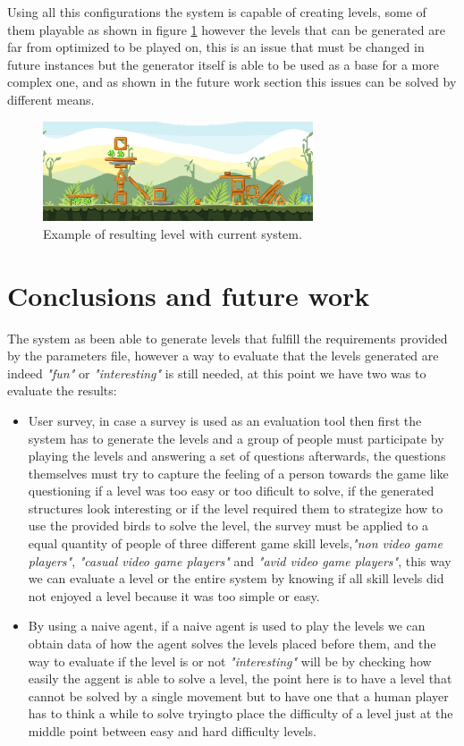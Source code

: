 \documentclass[conference]{IEEEtran}
\begin{document}
Using all this configurations the system is capable of creating levels, some of
them playable as shown in figure \ref{result_1} however the levels that can be
generated are far from optimized to be played on, this is an issue that must be
changed in future instances but the generator itself is able to be used as a
base for a more complex one, and as shown in the future work section this issues
can be solved by different means.

\begin{figure}[htbp]
    \centerline{\includegraphics[width=80mm]{Images/Result_n2.png}}
    \caption{Example of resulting level with current system.}
    \label{result_1}
\end{figure}

\section{Conclusions and future work}

The system as been able to generate levels that fulfill the requirements
 provided by the parameters file, however a way to evaluate that the levels
 generated are indeed \textit{"fun"} or \textit{"interesting"} is still needed,
 at this point we have two was to evaluate the results:
 \begin{itemize}
    \item User survey, in case a survey is used as an evaluation tool then first
    the system has to generate the levels and a group of people must participate
    by playing the levels and answering a set of questions afterwards, the
    questions themselves must try to capture the feeling of a person towards the
    game like questioning if a level was too easy or too dificult to solve, if
    the generated structures look interesting or if the level required them to
    strategize how to use the provided birds to solve the level, the survey must
    be applied to a equal quantity of people of three different game skill
    levels,\textit{"non video game players"}, \textit{"casual video game
    players"} and \textit{"avid video game players"}, this way we can evaluate a
    level or the entire system by knowing if all skill levels did not enjoyed a
    level because it was too simple or easy.
    \item By using a naive agent, if a naive agent is used to play the levels we
    can obtain data of how the agent solves the levels placed before them, and
    the way to evaluate if the level is or not \textit{"interesting"} will be by
    checking how easily the aggent is able to solve a level, the point here is
    to have a level that cannot be solved by a single movement but to have one
    that a human player has to think a while to solve tryingto place the
    difficulty of a level just at the middle point between easy and hard
    difficulty levels.
\end{itemize}
\end{document}
